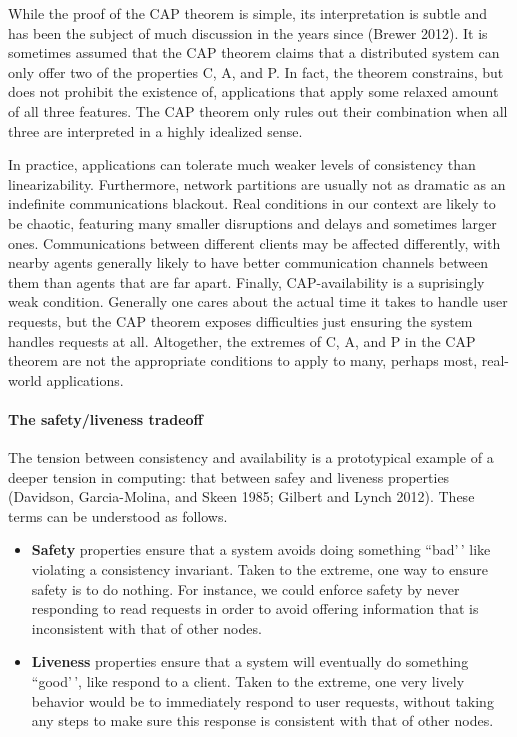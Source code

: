 \documentclass[]             %
{NASA}                       %
\theoremstyle{definition}
\begin{document}
While the proof of the CAP theorem is simple, its interpretation is
subtle and has been the subject of much discussion in the years since
(Brewer 2012). It is sometimes assumed that the CAP theorem claims that
a distributed system can only offer two of the properties C, A, and P.
In fact, the theorem constrains, but does not prohibit the existence of,
applications that apply some relaxed amount of all three features. The
CAP theorem only rules out their combination when all three are
interpreted in a highly idealized sense.

In practice, applications can tolerate much weaker levels of consistency
than linearizability. Furthermore, network partitions are usually not as
dramatic as an indefinite communications blackout. Real conditions in
our context are likely to be chaotic, featuring many smaller disruptions
and delays and sometimes larger ones. Communications between different
clients may be affected differently, with nearby agents generally likely
to have better communication channels between them than agents that are
far apart. Finally, CAP-availability is a suprisingly weak condition.
Generally one cares about the actual time it takes to handle user
requests, but the CAP theorem exposes difficulties just ensuring the
system handles requests at all. Altogether, the extremes of C, A, and P
in the CAP theorem are not the appropriate conditions to apply to many,
perhaps most, real-world applications.

\paragraph{The safety/liveness tradeoff}

The tension between consistency and availability is a prototypical
example of a deeper tension in computing: that between safey and
liveness properties (Davidson, Garcia-Molina, and Skeen 1985; Gilbert
and Lynch 2012). These terms can be understood as follows.

\begin{itemize}
\item
  \textbf{Safety} properties ensure that a system avoids doing something
  ``bad'\,' like violating a consistency invariant. Taken to the
  extreme, one way to ensure safety is to do nothing. For instance, we
  could enforce safety by never responding to read requests in order to
  avoid offering information that is inconsistent with that of other
  nodes.
\item
  \textbf{Liveness} properties ensure that a system will eventually do
  something ``good'\,', like respond to a client. Taken to the extreme,
  one very lively behavior would be to immediately respond to user
  requests, without taking any steps to make sure this response is
  consistent with that of other nodes.
\end{itemize}
\end{document}
